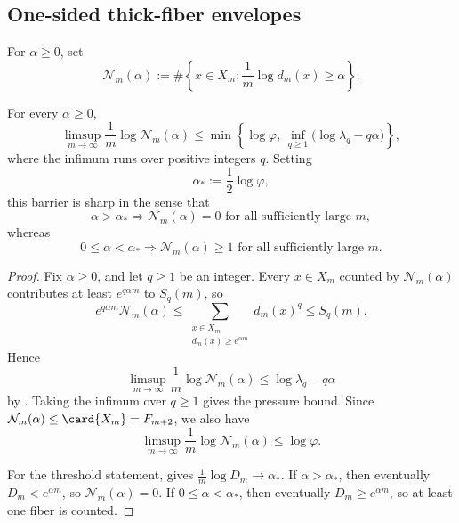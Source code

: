 ﻿\subsection{One-sided thick-fiber envelopes}

\begin{definition}
\label{def:thick-fibers}
For \(\alpha\ge0\), set
\[
  \mathcal N_m(\alpha):=
  \#\left\{x\in X_m:\frac1m\log d_m(x)\ge\alpha\right\}.
\]
\end{definition}

\begin{corollary}
\label{cor:thick-fiber-envelope}
For every \(\alpha\ge 0\),
\[
  \limsup_{m\to\infty}\frac{1}{m}\log \mathcal N_m(\alpha)
  \le
  \min\left\{
    \log\varphi,\,
    \inf_{q\ge 1}\bigl(\log \lambda_q-q\alpha\bigr)
  \right\},
\]
where the infimum runs over positive integers \(q\).  Setting
\[
  \alpha_\ast:=\frac12\log\varphi,
\]
this barrier is sharp in the sense that
\[
  \alpha>\alpha_\ast
  \Longrightarrow
  \mathcal N_m(\alpha)=0 \text{ for all sufficiently large }m,
\]
whereas
\[
  0\le \alpha<\alpha_\ast
  \Longrightarrow
  \mathcal N_m(\alpha)\ge 1 \text{ for all sufficiently large }m.
\]
\end{corollary}

\begin{proof}
Fix \(\alpha\ge 0\), and let \(q\ge 1\) be an integer.  Every
\(x\in X_m\) counted by \(\mathcal N_m(\alpha)\) contributes at least
\(e^{q\alpha m}\) to \(S_q(m)\), so
\[
  e^{q\alpha m}\mathcal N_m(\alpha)
  \le
  \sum_{\substack{x\in X_m\\ d_m(x)\ge e^{\alpha m}}} d_m(x)^q
  \le
  S_q(m).
\]
Hence
\[
  \limsup_{m\to\infty}\frac{1}{m}\log \mathcal N_m(\alpha)
  \le
  \log\lambda_q-q\alpha
\]
by .  Taking the infimum over \(q\ge 1\) gives the
pressure bound.  Since \(\mathcal N_m(\alpha)\le \card{X_m}=F_{m+2}\), we also
have
\[
  \limsup_{m\to\infty}\frac{1}{m}\log \mathcal N_m(\alpha)\le \log\varphi.
\]

For the threshold statement,  gives
\(
\frac{1}{m}\log D_m\to \alpha_\ast.
\)
If \(\alpha>\alpha_\ast\), then eventually \(D_m<e^{\alpha m}\), so
\(\mathcal N_m(\alpha)=0\).  If \(0\le \alpha<\alpha_\ast\), then eventually
\(D_m\ge e^{\alpha m}\), so at least one fiber is counted.
\end{proof}
